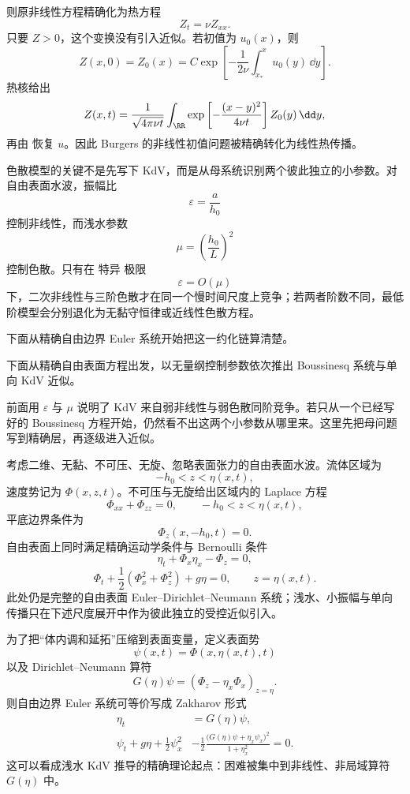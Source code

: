 则原非线性方程精确化为热方程
\begin{equation*}Z_t=\nu Z_{xx}.\end{equation*}
只要 $Z>0$，这个变换没有引入近似。若初值为 $u_0(x)$，则
\[
Z(x,0)
=Z_0(x)
=C\exp\left[
-\frac1{2\nu}
\int_{x_*}^xu_0(y)\,\dd y
\right].
\]
热核给出
\[
Z(x,t)=
\frac1{\sqrt{4\pi\nu t}}
\int_{\RR}
\exp\left[-\frac{(x-y)^2}{4\nu t}\right]
Z_0(y)\,\dd y,
\]
再由 恢复 $u$。因此 Burgers 的非线性初值问题被精确转化为线性热传播。

色散模型的关键不是先写下 KdV，而是从母系统识别两个彼此独立的小参数。对自由表面水波，振幅比
\[
\varepsilon=\frac{a}{h_0}
\]
控制非线性，而浅水参数
\[
\mu=\left(\frac{h_0}{L}\right)^2
\]
控制色散。只有在 特异 极限
\[
\varepsilon=O(\mu)
\]
下，二次非线性与三阶色散才在同一个慢时间尺度上竞争；若两者阶数不同，最低阶模型会分别退化为无黏守恒律或近线性色散方程。

下面从精确自由边界 Euler 系统开始把这一约化链算清楚。

下面从精确自由表面方程出发，以无量纲控制参数依次推出 Boussinesq 系统与单向 KdV 近似。

前面用 $\varepsilon$ 与 $\mu$ 说明了 KdV 来自弱非线性与弱色散同阶竞争。若只从一个已经写好的 Boussinesq 方程开始，仍然看不出这两个小参数从哪里来。这里先把母问题写到精确层，再逐级进入近似。

考虑二维、无黏、不可压、无旋、忽略表面张力的自由表面水波。流体区域为
\[
-h_0<z<\eta(x,t),
\]
速度势记为 $\Phi(x,z,t)$。不可压与无旋给出区域内的 Laplace 方程
\[
\Phi_{xx}+\Phi_{zz}=0,
\qquad -h_0<z<\eta(x,t),
\]
平底边界条件为
\[
\Phi_z(x,-h_0,t)=0.
\]
自由表面上同时满足精确运动学条件与 Bernoulli 条件
\[
\eta_t+\Phi_x\eta_x-\Phi_z=0,
\]
\[
\Phi_t+\frac12(\Phi_x^2+\Phi_z^2)+g\eta=0,
\qquad z=\eta(x,t).
\]
此处仍是完整的自由表面 Euler--Dirichlet--Neumann 系统；浅水、小振幅与单向传播只在下述尺度展开中作为彼此独立的受控近似引入。

为了把“体内调和延拓”压缩到表面变量，定义表面势
\[
\psi(x,t)=\Phi(x,\eta(x,t),t)
\]
以及 Dirichlet--Neumann 算符
\[
G(\eta)\psi=(\Phi_z-\eta_x\Phi_x)_{z=\eta}.
\]
则自由边界 Euler 系统可等价写成 Zakharov 形式
\begin{equation}
{
\begin{aligned}
\eta_t&=G(\eta)\psi,\\
\psi_t+g\eta+\frac12\psi_x^2
&-\frac12\frac{\bigl(G(\eta)\psi+\eta_x\psi_x\bigr)^2}{1+\eta_x^2}=0.
\end{aligned}
}
\label{eq:zakharov-water-wave}
\end{equation}
这可以看成浅水 KdV 推导的精确理论起点：困难被集中到非线性、非局域算符 $G(\eta)$ 中。

